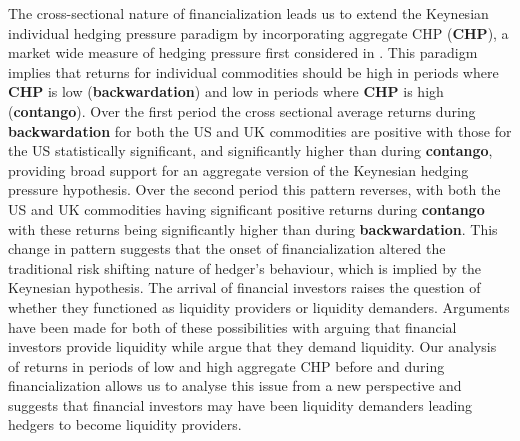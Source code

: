 \documentclass[12pt,]{article}
\begin{document}
The cross-sectional nature of financialization
\citep{basak_model_2016, cheng_financialization_2014} leads us to extend
the Keynesian individual hedging pressure paradigm by incorporating
aggregate CHP (\textbf{CHP}), a market wide measure of hedging pressure
first considered in \citet{hong_what_2012}. This paradigm implies that
returns for individual commodities should be high in periods where
\textbf{CHP} is low (\textbf{backwardation}) and low in periods where
\textbf{CHP} is high (\textbf{contango}). Over the first period the
cross sectional average returns during \textbf{backwardation} for both
the US and UK commodities are positive with those for the US
statistically significant, and significantly higher than during
\textbf{contango}, providing broad support for an aggregate version of
the Keynesian hedging pressure hypothesis. Over the second period this
pattern reverses, with both the US and UK commodities having significant
positive returns during \textbf{contango} with these returns being
significantly higher than during \textbf{backwardation}. This change in
pattern suggests that the onset of financialization altered the
traditional risk shifting nature of hedger's behaviour, which is implied
by the Keynesian hypothesis. The arrival of financial investors raises
the question of whether they functioned as liquidity providers or
liquidity demanders. Arguments have been made for both of these
possibilities with \citet{moskowitz_time_2012} arguing that financial
investors provide liquidity while \citet{Kangtaletwopremiums2017} argue
that they demand liquidity. Our analysis of returns in periods of low
and high aggregate CHP before and during financialization allows us to
analyse this issue from a new perspective and suggests that financial
investors may have been liquidity demanders leading hedgers to become
liquidity providers.
\end{document}
